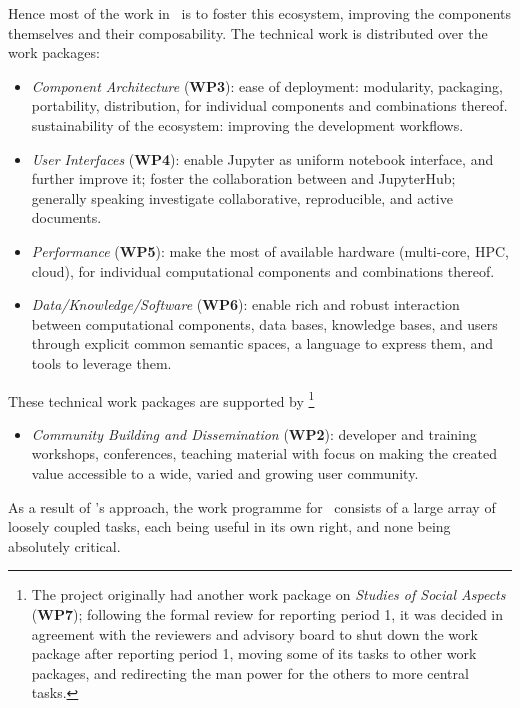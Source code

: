 Hence most of the work in \ODK\ is to foster this ecosystem, improving
the components themselves and their composability. The technical work is
distributed over the work packages:
\begin{itemize}
\item \emph{Component Architecture} (\textbf{WP3}): ease of
  deployment: modularity, packaging, portability, distribution, for
  individual components and combinations thereof. sustainability of
  the ecosystem: improving the development workflows.
\item \emph{User Interfaces} (\textbf{WP4}): enable Jupyter as uniform notebook
  interface, and further improve it; foster the collaboration between
  \cocalc and JupyterHub; generally speaking investigate
  collaborative, reproducible, and active documents.
\item \emph{Performance} (\textbf{WP5}): make the most of available hardware
  (multi-core, HPC, cloud), for individual computational components and
  combinations thereof.
\item \emph{Data/Knowledge/Software} (\textbf{WP6}): enable rich and robust
  interaction between computational components, data bases, knowledge
  bases, and users through explicit common semantic spaces, a language to
  express them, and tools to leverage them.
\end{itemize}
These technical work packages are supported by%
\footnote{The project originally had another work package on
  \emph{Studies of Social Aspects} (\textbf{WP7}); following the
  formal review for reporting period 1, it was decided in agreement
  with the reviewers and advisory board to shut down the work package
  after reporting period 1, moving some of its tasks to other work
  packages, and redirecting the man power for the others to more
  central tasks.}
\begin{itemize}
\item \emph{Community Building and Dissemination} (\textbf{WP2}): developer and
  training workshops, conferences, teaching material with focus on
  making the created value accessible to a wide, varied and growing user community.
\end{itemize}

As a result of \ODK's approach, the work programme for \ODK\ consists
of a large array of loosely coupled tasks, each being useful in its
own right, and none being absolutely critical.

